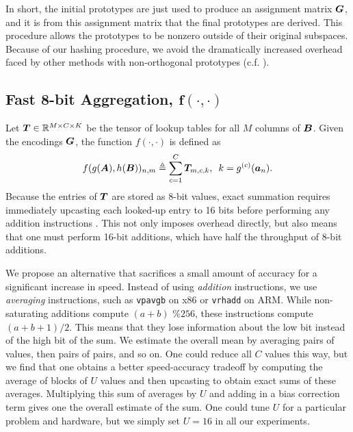 In short, the initial prototypes are just used to produce an assignment matrix $\bm{G}$, and it is from this assignment matrix that the final prototypes are derived. This procedure allows the prototypes to be nonzero outside of their original subspaces. Because of our hashing procedure, we avoid the dramatically increased overhead faced by other methods with non-orthogonal prototypes (c.f. \cite{otq,aq,cq,grvq,lsq,stackedQuantizers}).

\vspace{-1.5mm}
\subsection{Fast 8-bit Aggregation, $\bm{f(\cdot,\cdot)}$} \label{sec:aggregate}
\vspace{-.5mm}
Let $\bm{T} \in \mathbb{R}^{M \times C \times K}$ be the tensor of lookup tables for all $M$ columns of $\bm{B}$.
Given the encodings $\bm{G}$, the function $f(\cdot,\cdot)$ is defined as
\begin{align}
    f(g(\bm{A}), h(\bm{B}))_{n,m} \triangleq \sum_{c=1}^C \bm{T}_{m,c,k} \text{, }\text{ } k = g^{(c)}(\bm{a}_n).
\end{align}
Because the entries of $\bm{T}$ are stored as 8-bit values, exact summation requires immediately upcasting each looked-up entry to 16 bits before performing any addition instructions \cite{bolt}. This not only imposes overhead directly, but also means that one must perform 16-bit additions, which have half the throughput of 8-bit additions.

We propose an alternative that sacrifices a small amount of accuracy for a significant increase in speed. Instead of using \textit{addition} instructions, we use \textit{averaging} instructions, such as \texttt{vpavgb} on x86 or \texttt{vrhadd} on ARM. While non-saturating additions compute $(a + b) \text{ \% } 256$, these instructions compute $(a + b + 1) / 2$. This means that they lose information about the low bit instead of the high bit of the sum. We estimate the overall mean by averaging pairs of values, then pairs of pairs, and so on. One could reduce all $C$ values this way, but we find that one obtains a better speed-accuracy tradeoff by computing the average of blocks of $U$ values and then upcasting to obtain exact sums of these averages. Multiplying this sum of averages by $U$ and adding in a bias correction term gives one the overall estimate of the sum. One could tune $U$ for a particular problem and hardware, but we simply set $U = 16$ in all our experiments.


